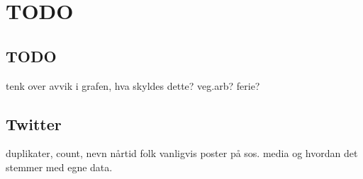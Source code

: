 \section{TODO}

\subsection{TODO}
tenk over avvik i grafen, hva skyldes dette? veg.arb? ferie?

\subsection{Twitter}
duplikater, count, nevn nårtid folk vanligvis poster på sos. media og hvordan det stemmer med egne data. 